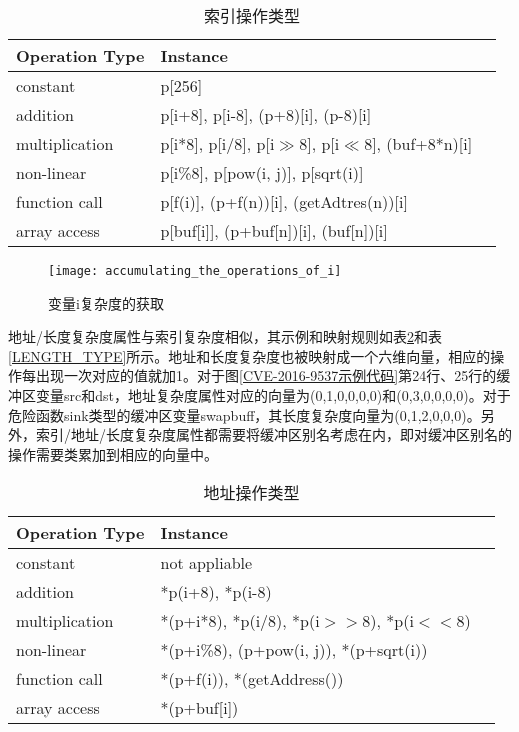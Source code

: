 {\begin{table}[ht]
\begin{center}
\caption{索引操作类型} \label{Index_Type}
\begin{small}
\begin{tabular}{lll}
\hline
{\bf Operation Type } & {\bf Instance}\\
\hline
constant & p[256] \\ \hline
addition & p[i+8], p[i-8], (p+8)[i], (p-8)[i] \\ \hline
multiplication & p[i*8], p[i/8], p[i$\gg$8], p[i$\ll$8], (buf+8*n)[i] \\ \hline
non-linear & p[i\%8], p[pow(i, j)], p[sqrt(i)] \\ \hline
function call & p[f(i)], (p+f(n))[i], (getAdtres(n))[i] \\ \hline
array access & p[buf[i]], (p+buf[n])[i], (buf[n])[i] \\ \hline
\end{tabular}
\end{small}
\end{center}
\end{table}

\begin{figure}[htp]
\centering
\texttt{[image: accumulating\_the\_operations\_of\_i]}
\caption{变量i复杂度的获取}
\label{accumulating_the_operations_of_i}
\end{figure}

地址/长度复杂度属性与索引复杂度相似，其示例和映射规则如表\ref{ADDRESS_TYPE}和表\ref{LENGTH_TYPE}所示。地址和长度复杂度也被映射成一个六维向量，相应的操作每出现一次对应的值就加1。对于图\ref{CVE-2016-9537示例代码}第24行、25行的缓冲区变量src和dst，地址复杂度属性对应的向量为{(0,1,0,0,0,0)}和{(0,3,0,0,0,0)}。对于危险函数sink类型的缓冲区变量swapbuff，其长度复杂度向量为{(0,1,2,0,0,0)}。另外，索引/地址/长度复杂度属性都需要将缓冲区别名考虑在内，即对缓冲区别名的操作需要类累加到相应的向量中。

\begin{table}[ht]
\begin{center}
\caption{地址操作类型} \label{ADDRESS_TYPE}
\begin{small}
\begin{tabular}{lll}
\hline
{\bf Operation Type } & {\bf Instance}\\
\hline
constant & not appliable \\ \hline
addition & *p(i+8), *p(i-8) \\ \hline
multiplication & *(p+i*8), *p(i/8), *p(i$>>$8), *p(i$<<8$) \\ \hline
non-linear & *(p+i\%8), (p+pow(i, j)), *(p+sqrt(i)) \\ \hline
function call & *(p+f(i)), *(getAddress()) \\ \hline
array access & *(p+buf[i]) \\ \hline
\end{tabular}
\end{small}
\end{center}
\end{table}


}
